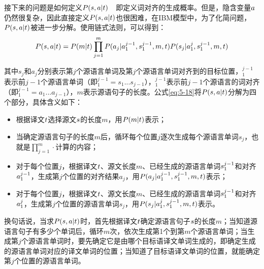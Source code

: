 \parinterval 接下来的问题是如何定义${P}({s},{a}|{t})$\ \dash \ 即定义词对齐的生成概率。但是，隐含变量${a}$仍然很复杂，因此直接定义${P}({s},{a}|{t})$也很困难，在IBM模型中，为了化简问题，${P}({s},{a}|{t})$被进一步分解。使用链式法则，可以得到：
\begin{eqnarray}
{P}({s},{a}|{t})={P}(m|{t})\prod_{j=1}^{m}{{P}(a_j|{a}{}_1^{j-1},{s}{}_1^{j-1},m,{t}){P}(s_j|{a}{}_1^{j},{s}{}_1^{j-1},m,{t})}
\label{eq:5-18}
\end{eqnarray}

\noindent  其中$s_j$和$a_j$分别表示第$j$个源语言单词及第$j$个源语言单词对齐到的目标位置，${{}_1^{j-1}}$表示前$j-1$个源语言单词（即${}_1^{j-1}=s_1...s_{j-1}$），${}_1^{j-1}$表示前$j-1$个源语言的词对齐（即${}_1^{j-1}=a_1...a_{j-1}$），$m$表示源语句子的长度。公式\eqref{eq:5-18}将${P}({s},{a}|{t})$分解为四个部分，具体含义如下：

\begin{itemize}
\vspace{0.5em}
\item 根据译文${t}$选择源文${s}$的长度$m$，用${P}(m|{t})$表示；
\vspace{0.5em}
\item 当确定源语言句子的长度$m$后，循环每个位置$j$逐次生成每个源语言单词$s_j$，也就是$\prod_{j=1}^m \cdot$计算的内容；
\vspace{0.5em}
\item 对于每个位置$j$，根据译文${t}$、源文长度$m$、已经生成的源语言单词${s}_1^{j-1}$和对齐${a}_1^{j-1}$，生成第$j$个位置的对齐结果$a_j$，用${P}(a_j|{a}_1^{j-1},{s}_1^{j-1},m,{t})$表示；
\vspace{0.5em}
\item 对于每个位置$j$，根据译文${t}$、源文长度$m$、已经生成的源语言单词${s}_1^{j-1}$和对齐${a}_1^j$，生成第$j$个位置的源语言单词$s_j$，用${P}(s_j|{a}_1^{j},{s}_1^{j-1},m,{t})$表示。
\vspace{0.5em}
\end{itemize}
\parinterval 换句话说，当求${P}({s},{a}|{t})$时，首先根据译文${t}$确定源语言句子${s}$的长度$m$；当知道源语言句子有多少个单词后，循环$m$次，依次生成第1个到第$m$个源语言单词；当生成第$j$个源语言单词时，要先确定它是由哪个目标语译文单词生成的，即确定生成的源语言单词对应的译文单词的位置；当知道了目标语译文单词的位置，就能确定第$j$个位置的源语言单词。

